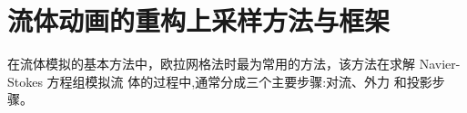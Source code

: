 
\chapter{流体动画的重构上采样方法与框架}

在流体模拟的基本方法中，欧拉网格法时最为常用的方法，该方法在求解 Navier-Stokes 方程组模拟流 体的过程中,通常分成三个主要步骤:对流、外力 和投影步骤。


\section{}

\subsection{}